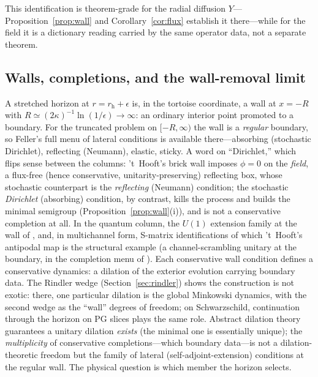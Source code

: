 \documentclass[11pt]{article}
\theoremstyle{definition}
\theoremstyle{remark}
\newcommand{\rh}{r_{\mathrm{h}}}
\begin{document}
\noindent This identification is theorem-grade for the radial diffusion
$Y$---Proposition~\ref{prop:wall} and Corollary~\ref{cor:flux} establish
it there---while for the field it is a dictionary reading carried by the
same operator data, not a separate theorem.

\subsection{Walls, completions, and the wall-removal limit}

A stretched horizon at $r=\rh+\epsilon$ is, in the tortoise
coordinate, a wall at $x=-R$ with
$R\simeq(2\kappa)^{-1}\ln(1/\epsilon)\to\infty$: an ordinary interior
point promoted to a boundary. For the truncated problem on
$[-R,\infty)$ the wall is a \emph{regular} boundary, so Feller's full
menu of lateral conditions is available there---absorbing
(stochastic Dirichlet), reflecting (Neumann), elastic, sticky. A word
on ``Dirichlet,'' which flips sense between the columns: 't~Hooft's
brick wall \cite{tHooftBrickWall1985} imposes $\phi=0$ on the
\emph{field}, a flux-free (hence conservative, unitarity-preserving)
reflecting box, whose stochastic counterpart is the \emph{reflecting}
(Neumann) condition; the stochastic \emph{Dirichlet} (absorbing)
condition, by contrast, kills the process and builds the minimal
semigroup (Proposition~\ref{prop:wall}(i)), and is not a conservative
completion at all. In the quantum column, the $U(1)$
extension family at the wall of \cite{Balachandran2018}, and, in
multichannel form, S-matrix identifications of which 't~Hooft's
antipodal map \cite{tHooftAntipodal2016} is the structural example
(a channel-scrambling unitary at the boundary, in the completion menu
of \cite{indivisible}). Each conservative wall condition defines a
conservative dynamics: a dilation of the exterior evolution carrying
boundary data. The Rindler wedge (Section~\ref{sec:rindler}) shows
the construction is not exotic: there, one particular dilation is the
global Minkowski dynamics, with the second wedge as the ``wall''
degrees of freedom; on Schwarzschild, continuation through the
horizon on PG slices plays the same role. Abstract dilation theory
\cite{SzNagyFoias,Davies1980} guarantees a unitary dilation
\emph{exists} (the minimal one is essentially unique); the
\emph{multiplicity} of conservative completions---which boundary
data---is not a dilation-theoretic freedom but the family of lateral
(self-adjoint-extension) conditions at the regular wall. The physical
question is which member the horizon selects.
\end{document}
